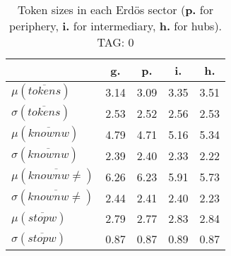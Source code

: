 \begin{table}[h!]
\begin{center}
\begin{tabular}{| l || c | c | c | c |}\hline
 & {\bf g.} & {\bf p.} & {\bf i.} & {\bf h.} \\\hline\hline
$\mu(\overline{tokens})$ & 3.14  & 3.09  & 3.35  & 3.51 \\
$\sigma(\overline{tokens})$ & 2.53  & 2.52  & 2.56  & 2.53 \\\hline
$\mu(\overline{knownw})$ & 4.79  & 4.71  & 5.16  & 5.34 \\
$\sigma(\overline{knownw})$ & 2.39  & 2.40  & 2.33  & 2.22 \\\hline
$\mu(\overline{knownw \neq})$ & 6.26  & 6.23  & 5.91  & 5.73 \\
$\sigma(\overline{knownw \neq})$ & 2.44  & 2.41  & 2.40  & 2.23 \\\hline
$\mu(\overline{stopw})$ & 2.79  & 2.77  & 2.83  & 2.84 \\
$\sigma(\overline{stopw})$ & 0.87  & 0.87  & 0.89  & 0.87 \\\hline
\end{tabular}
\caption{Token sizes in each Erd\"os sector ({{\bf p.}} for periphery, {{\bf i.}} for intermediary, {{\bf h.}} for hubs). TAG: 0}
\end{center}
\end{table}